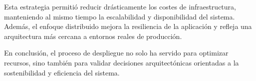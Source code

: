 Esta estrategia permitió reducir drásticamente los costes de infraestructura, manteniendo al mismo tiempo la escalabilidad y disponibilidad del sistema. Además, el enfoque distribuido mejora la resiliencia de la aplicación y refleja una arquitectura más cercana a entornos reales de producción.
 
En conclusión, el proceso de despliegue no solo ha servido para optimizar recursos, sino también para validar decisiones arquitectónicas orientadas a la sostenibilidad y eficiencia del sistema.